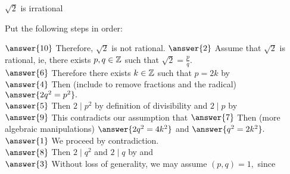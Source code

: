 \documentclass{ximera}
\begin{document}
\begin{br}
	\begin{prop*}
		$\sqrt{2}$ is irrational
	\end{prop*}



	\begin{prompt}
		Put the following steps in order:

			
			$\answer{10}$ Therefore, $\sqrt{2}$ is not rational.
			$\answer{2}$ Assume that $\sqrt{2}$ is rational, ie, there exists $p,q\in\mathbb Z$ such that $\sqrt{2}=\frac{p}{q}$.\\
			$\answer{6}$ Therefore there exists $k\in\mathbb Z$ such that $p=2k$ by   \\
			$\answer{4}$ Then (include to remove fractions and the radical) $\answer{2q^2=p^2}.$\\
			$\answer{5}$ Then $2\mid p^2$ by definition of divisibility and $2\mid p$ by   \\
				$\answer{9}$ This contradicts our assumption that 
			$\answer{7}$ Then (more algebraic manipulations) $\answer{2q^2=4k^2}$ and $\answer{q^2=2k^2}.$\\
			$\answer{1}$ We proceed by contradiction.\\
			$\answer{8}$ Then $2\mid q^2$ and $2\mid q$ by 
				and 	  \\
			$\answer{3}$ Without loss of generality, we may assume $(p,q)=1,$ since \\
			
	\end{prompt}
\end{br}
\end{document}
